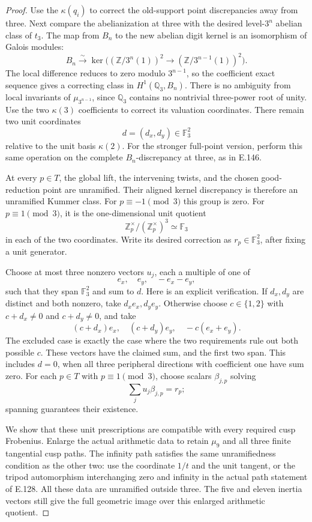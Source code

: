\begin{proof}
Use the \(\kappa(q_i)\) to correct the
old-support point discrepancies away
from three. Next compare the abelianization
at three with the desired level-\(3^n\)
abelian class of \(t_3\).
The map from \(B_n\) to the new abelian
digit kernel is an isomorphism of
Galois modules:
\[
 B_n\xrightarrow{\sim}
 \ker\bigl((\mathbb Z/3^n(1))^2
          \longrightarrow(\mathbb Z/3^{n-1}(1))^2\bigr).
 \tag{E.147.5}
\]
The local difference reduces to zero
modulo \(3^{n-1}\), so the coefficient
exact sequence gives a correcting class
in \(H^1(\mathbb Q_3,B_n)\).
There is no ambiguity from local
invariants of \(\mu_{3^{n-1}}\), since
\(\mathbb Q_3\) contains no nontrivial
three-power root of unity.
Use the two \(\kappa(3)\) coefficients
to correct its valuation coordinates.
There remain two unit coordinates
\[
                         d=(d_x,d_y)\in\mathbb F_3^2
 \tag{E.147.6}
\]
relative to the unit basis \(\kappa(2)\).
For the stronger full-point version,
perform this same operation on the
complete \(B_n\)-discrepancy at three,
as in E.146.

At every \(p\in T\), the global lift,
the intervening twists, and the chosen
good-reduction point are unramified.
Their aligned kernel discrepancy is
therefore an unramified Kummer class.
For \(p\equiv-1\pmod3\) this group is zero.
For \(p\equiv1\pmod3\), it is the
one-dimensional unit quotient
\[
 \mathbb Z_p^\times/(\mathbb Z_p^\times)^3
             \simeq\mathbb F_3
 \tag{E.147.7}
\]
in each of the two coordinates.
Write its desired correction as
\(r_p\in\mathbb F_3^2\), after fixing
a unit generator.

Choose at most three nonzero vectors
\(u_j\), each a multiple of one of
\[
             e_x,\quad e_y,\quad -e_x-e_y,
 \tag{E.147.8}
\]
such that they span \(\mathbb F_3^2\)
and sum to \(d\).
Here is an explicit verification.
If \(d_x,d_y\) are distinct and both
nonzero, take \(d_xe_x,d_ye_y\).
Otherwise choose \(c\in\{1,2\}\) with
\(c+d_x\ne0\) and \(c+d_y\ne0\), and take
\[
 (c+d_x)e_x,\quad(c+d_y)e_y,\quad
                            -c(e_x+e_y).
 \tag{E.147.9}
\]
The excluded case is exactly the case
where the two requirements rule out both
possible \(c\). These vectors have the
claimed sum, and the first two span.
This includes \(d=0\), when all three
peripheral directions with coefficient
one have sum zero.
For each \(p\in T\) with \(p\equiv1\pmod3\),
choose scalars \(\beta_{j,p}\) solving
\[
                      \sum_j u_j\beta_{j,p}=r_p;
 \tag{E.147.10}
\]
spanning guarantees their existence.

We show that these unit prescriptions
are compatible with every required
cusp Frobenius.
Enlarge the actual arithmetic data to
retain \(\mu_9\) and all three finite
tangential cusp paths. The infinity
path satisfies the same unramifiedness
condition as the other two: use the
coordinate \(1/t\) and the unit tangent,
or the tripod automorphism interchanging
zero and infinity in the actual path
statement of E.128.
All these data are unramified outside
three.
The five and eleven inertia vectors
still give the full geometric image
over this enlarged arithmetic quotient.


\end{proof}
